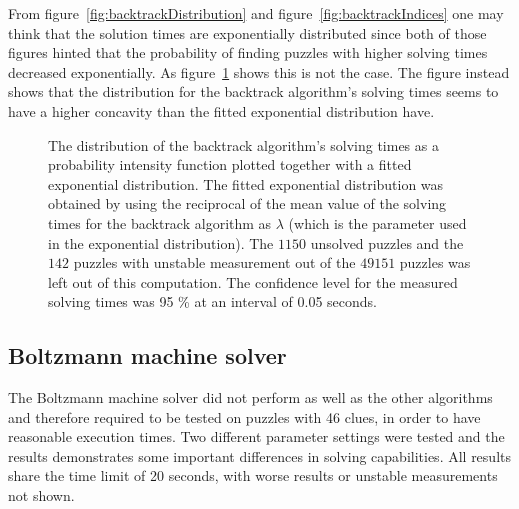 \documentclass[a4paper,11pt]{kth-mag}
\begin{document}
\FloatBarrier
From figure~\ref{fig:backtrackDistribution} and figure~\ref{fig:backtrackIndices} one may think that the solution times are exponentially distributed since both of those figures hinted that the probability of finding puzzles with higher solving times decreased exponentially.
As figure~\ref{fig:backtrackExponential} shows this is not the case.
The figure instead shows that the distribution for the backtrack algorithm's solving times seems to have a higher concavity than the fitted exponential distribution have.

\begin{figure}[here] 
\noindent{}
\vspace{-15pt}
\caption[Backtrack solving times as a probability intensity function]{The distribution of the backtrack algorithm's solving times as a probability intensity function plotted together with a fitted exponential distribution. 
The fitted exponential distribution was obtained by using the reciprocal of the mean value of the solving times for the backtrack algorithm as $\lambda$ (which is the parameter used in the exponential distribution). 
The $1150$ unsolved puzzles and the $142$ puzzles with unstable measurement out of the $49151$ puzzles was left out of this computation. 
The confidence level for the measured solving times was 95 \% at an interval of 0.05 seconds.}
\label{fig:backtrackExponential}
\end{figure}

\FloatBarrier
\subsection{Boltzmann machine solver}
The Boltzmann machine solver did not perform as well as the other algorithms and therefore required to be tested on puzzles with 46 clues, in order to have reasonable execution times.
Two different parameter settings were tested and the results demonstrates some important differences in solving capabilities.
All results share the time limit of 20 seconds, with worse results or unstable measurements not shown.
\end{document}
